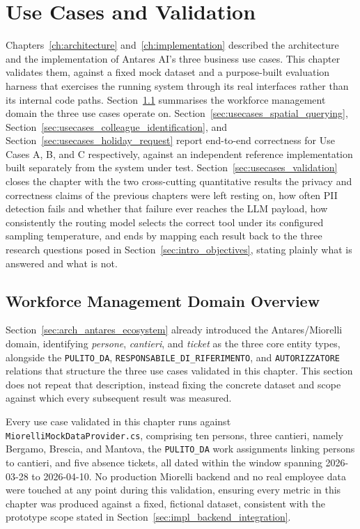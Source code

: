\chapter{Use Cases and Validation}
\label{ch:usecases}

Chapters~\ref{ch:architecture} and~\ref{ch:implementation} described the architecture and the implementation of Antares AI's three business use cases. This chapter validates them, against a fixed mock dataset and a purpose-built evaluation harness that exercises the running system through its real interfaces rather than its internal code paths. Section~\ref{sec:usecases_domain_overview} summarises the workforce management domain the three use cases operate on. Section~\ref{sec:usecases_spatial_querying}, Section~\ref{sec:usecases_colleague_identification}, and Section~\ref{sec:usecases_holiday_request} report end-to-end correctness for Use Cases A, B, and C respectively, against an independent reference implementation built separately from the system under test. Section~\ref{sec:usecases_validation} closes the chapter with the two cross-cutting quantitative results the privacy and correctness claims of the previous chapters were left resting on, how often PII detection fails and whether that failure ever reaches the LLM payload, how consistently the routing model selects the correct tool under its configured sampling temperature, and ends by mapping each result back to the three research questions posed in Section~\ref{sec:intro_objectives}, stating plainly what is answered and what is not.

\section{Workforce Management Domain Overview}
\label{sec:usecases_domain_overview}

Section~\ref{sec:arch_antares_ecosystem} already introduced the Antares/Miorelli domain, identifying \emph{persone}, \emph{cantieri}, and \emph{ticket} as the three core entity types, alongside the \texttt{PULITO\_DA}, \texttt{RESPONSABILE\_DI\_RIFERIMENTO}, and \texttt{AUTORIZZATORE} relations that structure the three use cases validated in this chapter. This section does not repeat that description, instead fixing the concrete dataset and scope against which every subsequent result was measured.

Every use case validated in this chapter runs against \texttt{MiorelliMockDataProvider.cs}, comprising ten persons, three cantieri, namely Bergamo, Brescia, and Mantova, the \texttt{PULITO\_DA} work assignments linking persons to cantieri, and five absence tickets, all dated within the window spanning 2026-03-28 to 2026-04-10. No production Miorelli backend and no real employee data were touched at any point during this validation, ensuring every metric in this chapter was produced against a fixed, fictional dataset, consistent with the prototype scope stated in Section~\ref{sec:impl_backend_integration}.

